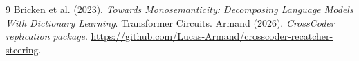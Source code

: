 \documentclass[10pt]{article}
\begin{document}
\setcounter{section}{6}
\setcounter{subsection}{7}
\setcounter{subsubsection}{3}

\clearpage
\begin{thebibliography}{9}
 Bricken et al. (2023). \emph{Towards Monosemanticity: Decomposing Language Models With Dictionary Learning}. Transformer Circuits.
 Armand (2026). \emph{CrossCoder replication package}. \url{https://github.com/Lucas-Armand/crosscoder-recatcher-steering}.
\end{thebibliography}
\end{document}
